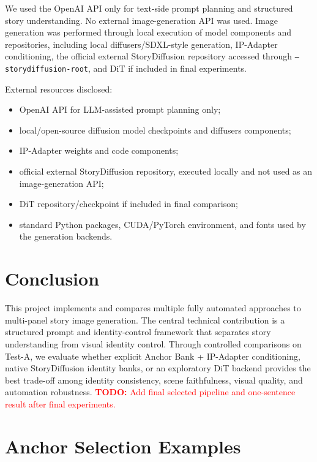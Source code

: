 \documentclass[11pt,a4paper]{article}
\newcommand{\todo}[1]{\textcolor{red}{\textbf{TODO:} #1}}
\begin{document}
We used the OpenAI API only for text-side prompt planning and structured story understanding. No external image-generation API was used. Image generation was performed through local execution of model components and repositories, including local diffusers/SDXL-style generation, IP-Adapter conditioning, the official external StoryDiffusion repository accessed through \texttt{--storydiffusion-root}, and DiT if included in final experiments.

External resources disclosed:

\begin{itemize}[leftmargin=*]
    \item OpenAI API for LLM-assisted prompt planning only;
    \item local/open-source diffusion model checkpoints and diffusers components;
    \item IP-Adapter weights and code components;
    \item official external StoryDiffusion repository, executed locally and not used as an image-generation API;
    \item DiT repository/checkpoint if included in final comparison;
    \item standard Python packages, CUDA/PyTorch environment, and fonts used by the generation backends.
\end{itemize}

\section{Conclusion}

This project implements and compares multiple fully automated approaches to multi-panel story image generation. The central technical contribution is a structured prompt and identity-control framework that separates story understanding from visual identity control. Through controlled comparisons on Test-A, we evaluate whether explicit Anchor Bank + IP-Adapter conditioning, native StoryDiffusion identity banks, or an exploratory DiT backend provides the best trade-off among identity consistency, scene faithfulness, visual quality, and automation robustness. \todo{Add final selected pipeline and one-sentence result after final experiments.}

\appendix

\section{Anchor Selection Examples}
\end{document}
